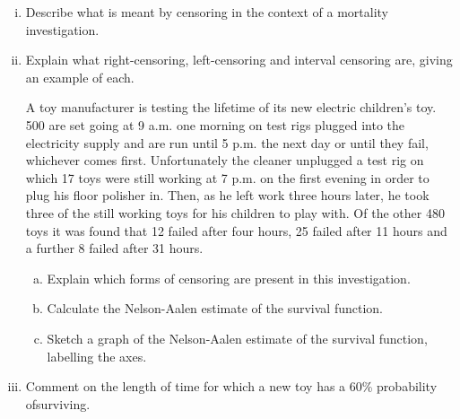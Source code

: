 \documentclass[a4paper,12pt]{article}
\begin{document}
\begin{enumerate}[(i)]
(i)
(ii)
\item Describe what is meant by censoring in the context of a mortality
investigation.

\item Explain what right-censoring, left-censoring and interval censoring are, giving an example of each.

\medskip A toy manufacturer is testing the lifetime of its new electric children’s toy. 500 are set going at 9 a.m. one morning on test rigs plugged into the electricity supply and are run until 5 p.m. the next day or until they fail, whichever comes first. Unfortunately the cleaner unplugged a test rig on which 17 toys were still working at 7 p.m. on the first evening in order to plug his floor polisher in. Then, as he left work three hours later, he took three of the still working toys for his children to play with. Of the other 480 toys it was found that 12 failed after four hours, 25 failed after 11 hours and a further 8 failed after 31 hours.

\begin{enumerate}[(a)]
\item Explain which forms of censoring are present in this investigation. 
\item Calculate the Nelson-Aalen estimate of the survival function. 
\item Sketch a graph of the Nelson-Aalen estimate of the survival function, labelling the axes.
\end{enumerate}
\item  Comment on the length of time for which a new toy has a 60\% probability ofsurviving.
\end{enumerate}
\end{document}
